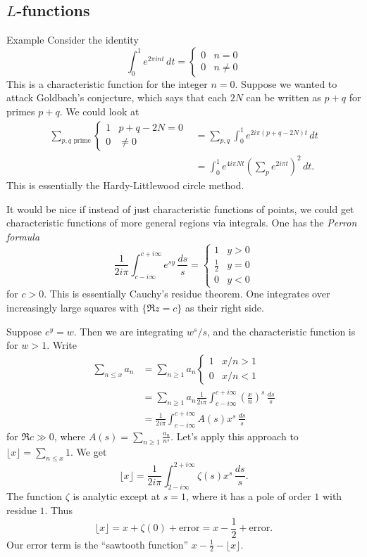 \subsection{\texorpdfstring{$L$}{L}-functions}

\begin{enonce}[remark]{Example}
Consider the identity 
\[
  \int_0^1 e^{2\pi i n t}\, dt = \begin{cases} 0 & n=0 \\ 0 & n\ne 0\end{cases} 
\]
This is a characteristic function for the integer $n=0$. Suppose we wanted to 
attack Goldbach's conjecture, which says that each $2 N$ can be written as 
$p+q$ for primes $p+q$. We could look at 
\begin{align*}
  \sum_{p,q\text{ prime}} \begin{cases}1 & p+q-2 N = 0 \\ 0 & \ne 0\end{cases} 
    &= \sum_{p,q} \int_0^1 e^{2i\pi(p+q-2 N) t}\, dt \\
    &= \int_0^1 e^{4 i \pi N t}\left(\sum_p e^{2i \pi t}\right)^2\, dt .
\end{align*}
This is essentially the Hardy-Littlewood circle method. 
\end{enonce}

It would be nice if instead of just characteristic functions of points, we 
could get characteristic functions of more general regions via integrals. One 
has the \emph{Perron formula} 
\[
  \frac{1}{2i\pi} \int_{c-i\infty}^{c+i\infty} e^{s y}\, \frac{ds}{s} = \begin{cases} 1 & y>0 \\ \frac 1 2 & y=0 \\ 0 & y<0 \end{cases} 
\]
for $c>0$. This is essentially Cauchy's residue theorem. One integrates over 
increasingly large squares with $\{\Re z=c\}$ as their right side. 

Suppose $e^y=w$. Then we are integrating $w^s/s$, and the characteristic 
function is for $w>1$. Write 
\begin{align*}
  \sum_{n\leqslant x} a_n 
    &= \sum_{n\geqslant 1} a_n \begin{cases} 1 & x/n>1 \\ 0 & x/n<1 \end{cases} \\
    &= \sum_{n\geqslant 1} a_n \frac{1}{2i\pi} \int_{c-i\infty}^{c+i\infty} \left(\frac x n\right)^s\, \frac{ds}{s} \\
    &= \frac{1}{2i\pi} \int_{c-i\infty}^{c+i\infty} A(s) x^s\, \frac{ds}{s} 
\end{align*}
for $\Re c\gg 0$, where $A(s)=\sum_{n\geqslant 1} \frac{a_n}{n^s}$. 
Let's apply this approach to $\lfloor x\rfloor = \sum_{n\leqslant x} 1$. We get 
\[
  \lfloor x\rfloor = \frac{1}{2i\pi} \int_{2-i\infty}^{2+i\infty} \zeta(s) x^s\, \frac{ds}{s} .
\]
The function $\zeta$ is analytic except at $s=1$, where it has a pole of 
order $1$ with residue $1$. Thus 
\[
  \lfloor x\rfloor = x + \zeta(0) + \text{error} = x-\frac 1 2 + \text{error} .
\]
Our error term is the ``sawtooth function'' $x-\frac 1 2 - \lfloor x\rfloor$. 


